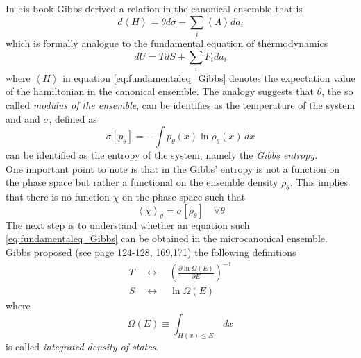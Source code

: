In his book \cite{gibbs_2010} Gibbs derived a relation in the canonical ensemble that is
\begin{equation}
    d\left\langle H \right\rangle = \theta d\sigma - \sum_i \left\langle A \right\rangle da_i
    \label{eq:fundamentaleq_Gibbs}
\end{equation}
which is formally analogue to the fundamental equation of thermodynamics
\begin{equation*}
    dU = TdS + \sum_i F_i da_i
\end{equation*}
where $\left\langle H \right\rangle$ in equation \ref{eq:fundamentaleq_Gibbs} denotes the expectation value of the hamiltonian in the canonical ensemble.
The analogy suggests that $\theta$, the so called \emph{modulus of the ensemble}, can be identifies as the temperature of the system and  and $\sigma$, defined as
\begin{equation*}
    \sigma[p_{\theta}] = - \int p_{\theta}(x) \ln \rho_{\theta}(x) \, dx
\end{equation*}
can be identified as the entropy of the system, namely the \emph{Gibbs entropy}. \\
One important point to note is that in the Gibbs' entropy is not a function on the phase space but rather a functional on the ensemble density $\rho_{\theta}$. This implies that there is no function $\chi$ on the phase space such that 
\begin{equation*}
    \left\langle \chi \right\rangle_{\theta} = \sigma[\rho_{\theta}] \quad \forall \theta
\end{equation*}
The next step is to understand whether an equation such \ref{eq:fundamentaleq_Gibbs} can be obtained in the microcanonical ensemble. Gibbs proposed (see \cite{gibbs_2010} page 124-128, 169,171) the following definitions
\begin{gather*}
    T \quad \longleftrightarrow \quad \left(\frac{\partial \ln \Omega(E)}{\partial E}\right)^{-1} \\
    S \quad \longleftrightarrow \quad \ln \Omega(E)
\end{gather*}
where 
\begin{equation}
    \Omega(E) \equiv \int_{H(x) \leq E} \, dx
    \label{eq:Omega_E}
\end{equation}
is called \emph{integrated density of states}. 

